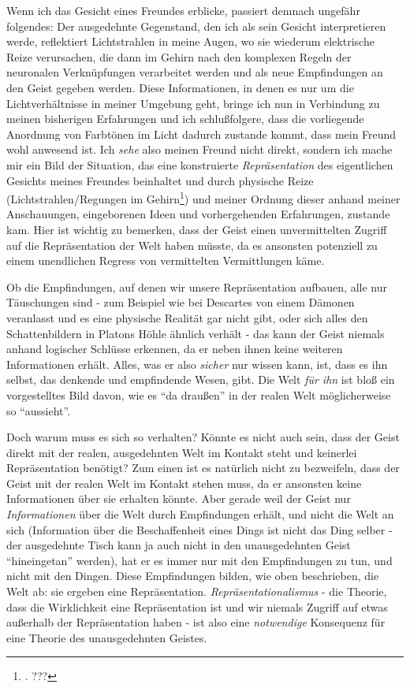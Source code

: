 \documentclass[a4paper, 12pt]{article}
\begin{document}
\begin{onehalfspace}
Wenn ich das Gesicht eines Freundes erblicke, passiert demnach ungefähr folgendes: Der ausgedehnte Gegenstand, den ich als sein Gesicht interpretieren werde, reflektiert Lichtstrahlen in meine Augen, wo sie wiederum elektrische Reize verursachen, die dann im Gehirn nach den komplexen Regeln der neuronalen Verknüpfungen verarbeitet werden und als neue Empfindungen an den Geist gegeben werden. Diese Informationen, in denen es nur um die Lichtverhältnisse in meiner Umgebung geht, bringe ich nun in Verbindung zu meinen bisherigen Erfahrungen und ich schlußfolgere, dass die vorliegende Anordnung von Farbtönen im Licht dadurch zustande kommt, dass mein Freund wohl anwesend ist. Ich \emph{sehe} also meinen Freund nicht direkt, sondern ich mache mir ein Bild der Situation, das eine konstruierte \emph{Repräsentation} des eigentlichen Gesichts meines Freundes beinhaltet und durch physische Reize (Lichtstrahlen/Regungen im Gehirn\footnote{\Cite[Vgl.][S. 270f.]{scheler-idole}. ???}) und meiner Ordnung dieser anhand meiner Anschauungen, eingeborenen Ideen und vorhergehenden Erfahrungen, zustande kam. Hier ist wichtig zu bemerken, dass der Geist einen unvermittelten Zugriff auf die Repräsentation der Welt haben müsste, da es ansonsten potenziell zu einem unendlichen Regress von vermittelten Vermittlungen käme.

Ob die Empfindungen, auf denen wir unsere Repräsentation aufbauen, alle nur Täu\-schungen sind - zum Beispiel wie bei Descartes von einem Dämonen veranlasst und es eine physische Realität gar nicht gibt, oder sich alles den Schattenbildern in Platons Höhle ähnlich verhält - das kann der Geist niemals anhand logischer Schlüsse erkennen, da er neben ihnen keine weiteren Informationen erhält. Alles, was er also \emph{sicher} nur wissen kann, ist, dass es ihn selbst, das denkende und empfindende Wesen, gibt. Die Welt \emph{für ihn} ist bloß ein vorgestelltes Bild davon, wie es "`da draußen"' in der realen Welt möglicherweise so "`aussieht"'.

Doch warum muss es sich so verhalten? Könnte es nicht auch sein, dass der Geist direkt mit der realen, ausgedehnten Welt im Kontakt steht und keinerlei Repräsentation benötigt? Zum einen ist es natürlich nicht zu bezweifeln, dass der Geist mit der realen Welt im Kontakt stehen muss, da er ansonsten keine Informationen über sie erhalten könnte. Aber gerade weil der Geist nur \emph{Informationen} über die Welt durch Empfindungen erhält, und nicht die Welt an sich (Information über die Beschaffenheit eines Dings ist nicht das Ding selber - der ausgedehnte Tisch kann ja auch nicht in den unausgedehnten Geist "`hineingetan"' werden), hat er es immer nur mit den Empfindungen zu tun, und nicht mit den Dingen. Diese Empfindungen bilden, wie oben beschrieben, die Welt ab: sie ergeben eine Repräsentation. \emph{Repräsentationalismus} - die Theorie, dass die Wirklichkeit eine Repräsentation ist und wir niemals Zugriff auf etwas außerhalb der Repräsentation haben - ist also eine \emph{notwendige} Konsequenz für eine Theorie des unausgedehnten Geistes.


\end{onehalfspace}
\end{document}
